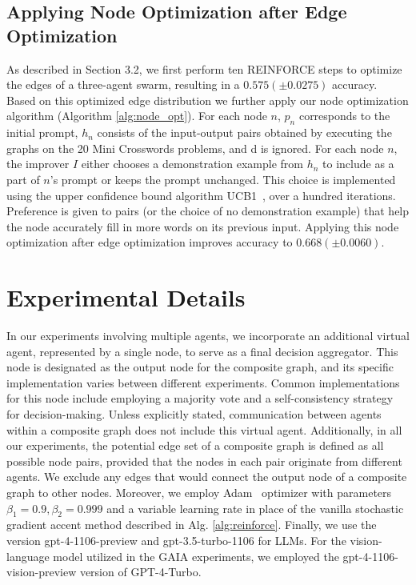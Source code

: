 \documentclass{article}
\theoremstyle{plain}
\theoremstyle{definition}
\theoremstyle{remark}
\begin{document}
\subsection{Applying Node Optimization after Edge Optimization}
As described in Section 3.2, we first perform ten REINFORCE steps to optimize the edges of a three-agent swarm, resulting in a $0.575(\pm0.0275)$ accuracy.
Based on this optimized edge distribution we further apply our node optimization algorithm (Algorithm \ref{alg:node_opt}).
For each node $n$, $p_n$ corresponds to the initial prompt, $h_n$ consists of the input-output pairs obtained by executing the graphs on the 20 Mini Crosswords problems, and d is ignored.
For each node $n$, the improver $I$ either chooses a demonstration example from $h_n$ to include as a part of $n$’s prompt or keeps the prompt unchanged.
This choice is implemented using the upper confidence bound algorithm UCB1~\citep{auer2002finite}, over a hundred iterations.
Preference is given to pairs (or the choice of no demonstration example) that help the node accurately fill in more words on its previous input.
Applying this node optimization after edge optimization improves accuracy to $0.668 (\pm 0.0060)$. 

\section{Experimental Details}
\label{app:experiment}
In our experiments involving multiple agents, we incorporate an additional virtual agent, represented by a single node, to serve as a final decision aggregator.
This node is designated as the output node for the composite graph, and its specific implementation varies between different experiments.
Common implementations for this node include employing a majority vote and a self-consistency strategy for decision-making.
Unless explicitly stated, communication between agents within a composite graph does not include this virtual agent.
Additionally, in all our experiments, the potential edge set of a composite graph is defined as all possible node pairs, provided that the nodes in each pair originate from different agents.
We exclude any edges that would connect the output node of a composite graph to other nodes.
Moreover, we employ Adam~\citep{kingma2014adam} optimizer with parameters $\beta_1 = 0.9, \beta_2 = 0.999$ and a variable learning rate in place of the vanilla stochastic gradient accent method described in Alg. \ref{alg:reinforce}. Finally, we use the version gpt-4-1106-preview and gpt-3.5-turbo-1106 for LLMs. For the vision-language model utilized in the GAIA experiments, we employed the gpt-4-1106-vision-preview version of GPT-4-Turbo.
\end{document}
